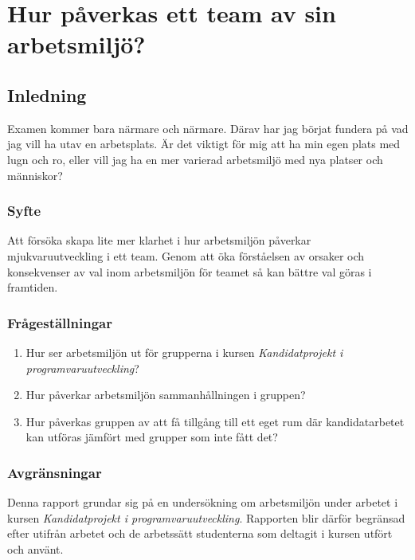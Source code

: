 \chapter{Hur påverkas ett team av sin arbetsmiljö?}
\label{cha:indiv-report-hampus}

\section{Inledning}
\label{sec:introduction-hampus}

Examen kommer bara närmare och närmare. Därav har jag börjat fundera på vad jag vill ha utav en arbetsplats. Är det viktigt för mig att ha min egen plats med lugn och ro, eller vill jag ha en mer varierad arbetsmiljö med nya platser och människor?

\subsection{Syfte}
\label{sec:purpose-hampus}

Att försöka skapa lite mer klarhet i hur arbetsmiljön påverkar mjukvaruutveckling i ett team. Genom att öka förståelsen av orsaker och konsekvenser av val inom arbetsmiljön för teamet så kan bättre val göras i framtiden.

\subsection{Frågeställningar}
\label{sec:issue-hampus}

\begin{enumerate}
\item Hur ser arbetsmiljön ut för grupperna i kursen \textit{Kandidatprojekt i programvaruutveckling}?
\item Hur påverkar arbetsmiljön sammanhållningen i gruppen?
\item Hur påverkas gruppen av att få tillgång till ett eget rum där kandidatarbetet kan utföras jämfört med grupper som inte fått det?
\end{enumerate}

\subsection{Avgränsningar}
Denna rapport grundar sig på en undersökning om arbetsmiljön under arbetet i kursen \textit{Kandidatprojekt i programvaruutveckling}. Rapporten blir därför begränsad efter utifrån arbetet och de arbetssätt studenterna som deltagit i kursen utfört och använt.

